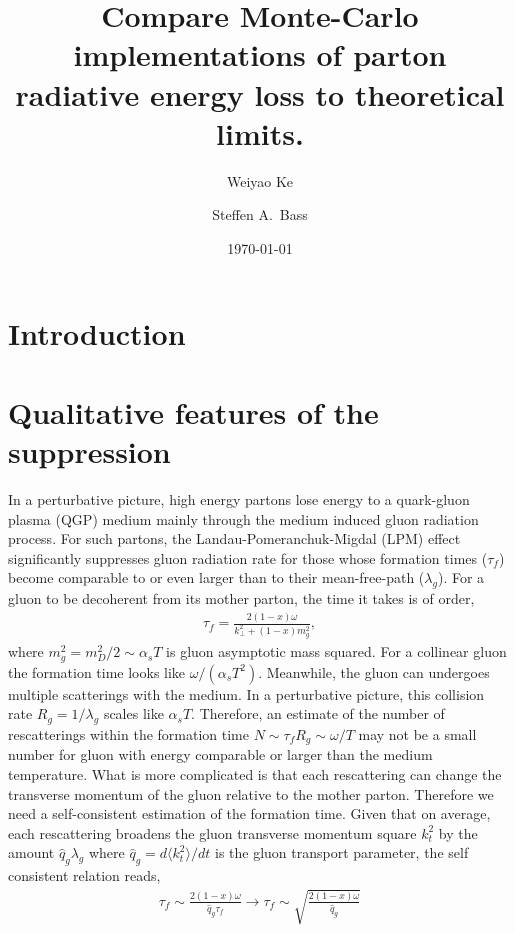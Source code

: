 \documentclass[aps, prc, reprint, amsmath, groupedaddress, nofootinbib]{revtex4-1}
\begin{document}
\title{Compare Monte-Carlo implementations of parton radiative energy loss to theoretical limits.}
\author{Weiyao Ke}
\author{Steffen A.\ Bass}
\date{\today}
\maketitle

\section{Introduction}
\section{Qualitative features of the suppression}
In a perturbative picture, high energy partons lose energy to a quark-gluon plasma (QGP) medium mainly through the medium induced gluon radiation process.
For such partons, the Landau-Pomeranchuk-Migdal (LPM) effect significantly suppresses gluon radiation rate for those whose formation times ($\tau_f$) become comparable to or even larger than to their mean-free-path ($\lambda_g$).
For a gluon to be decoherent from its mother parton, the time it takes is of order,
\begin{eqnarray}\label{eq:tau_1}
\tau_f = \frac{2(1-x)\omega}{k_\perp^2+(1-x)m_g^2},
\end{eqnarray}
where $m_g^2=m_D^2/2 \sim \alpha_s T$ is gluon asymptotic mass squared.
For a collinear gluon the formation time looks like $\omega/(\alpha_s T^2)$.
Meanwhile, the gluon can undergoes multiple scatterings with the medium.
In a perturbative picture, this collision rate $R_{g} = 1/\lambda_g$ scales like $\alpha_s T$. 
Therefore, an estimate of the number of rescatterings within the formation time $N \sim \tau_f R_g \sim \omega/T$ may not be a small number for gluon with energy comparable or larger than the medium temperature.
What is more complicated is that each rescattering can change the transverse momentum of the gluon relative to the mother parton.
Therefore we need a self-consistent estimation of the formation time.
Given that on average, each rescattering broadens the gluon transverse momentum square $k_t^2$ by the amount $\hat{q}_g\lambda_g$ where $\hat{q}_g = d\langle k_t^2\rangle/dt$ is the gluon transport parameter, the self consistent relation reads,
\begin{eqnarray}\label{eq:tau_n}
\tau_f \sim \frac{2(1-x)\omega}{\hat{q}_g\tau_f} \longrightarrow \tau_f \sim \sqrt{\frac{2(1-x)\omega}{\hat{q}_g}}
\end{eqnarray}
\end{document}

